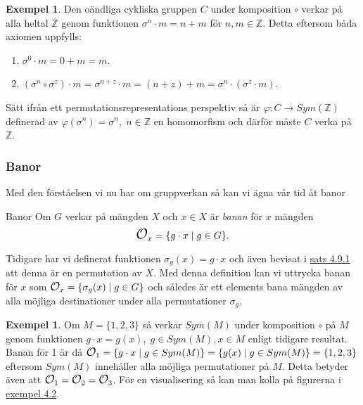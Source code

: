 \documentclass{article}
\newcommand{\orbit}[0]{\mathlarger{\mathlarger{\mathcal{O}}}}
\theoremstyle{definition}
\newtheorem{exmp}[thm]{Exempel}
\begin{document}
\begin{exmp}
  Den oändliga cykliska gruppen $C$ under komposition $\circ$ verkar på alla heltal $\mathbb{Z}$
  genom funktionen $\sigma^n \cdot m = n + m$ för $n, m \in \mathbb{Z}$.
  Detta eftersom båda axiomen uppfylls:
  \begin{enumerate}
    \item $\sigma^0 \cdot m = 0 + m = m$.
    \item $(\sigma^n \circ \sigma^z) \cdot m = \sigma^{n + z} \cdot m = (n + z) + m = 
    \sigma^n \cdot (\sigma^z \cdot m)$.
  \end{enumerate}
  Sätt ifrån ett permutationsrepresentations perspektiv så är 
  $\varphi: C \rightarrow Sym(\mathbb{Z})$ definerad av $\varphi(\sigma^n) = \sigma^n, \; 
  n \in \mathbb{Z}$ en homomorfism och därför måste $C$ verka på $\mathbb{Z}$.
\end{exmp}


\subsubsection{Banor}
Med den förståelsen vi nu har om gruppverkan så kan vi ägna vår tid åt banor
\begin{mydef}{Banor}{}
  Om $G$ verkar på mängden $X$ och $x \in X$ är \textit{banan} för $x$ mängden 
  \[\orbit_x = \{g \cdot x \; | \; g \in G\}.\]
\end{mydef}
Tidigare har vi definerat funktionen $\sigma_g(x) = g \cdot x$ och även bevisat i 
\hyperlink{sats4.9.1}{sats 4.9.1} att 
denna är en permutation av $X$. Med denna definition kan vi uttrycka banan för $x$ som 
$\orbit_x = \{\sigma_g(x) \; | \; g \in G\}$ och 
således är ett elements bana mängden av alla möjliga destinationer under alla permutationer 
$\sigma_g$.

\begin{exmp}
  Om $M = \{1, 2, 3\}$ så verkar $Sym(M)$ under komposition $\circ$ på $M$ 
  genom funktionen $g \cdot x = g(x), \; g \in Sym(M), x \in M$ enligt tidigare resultat. Banan för 
  1 är då $\orbit_1 = \{g \cdot x \; | \; g \in Sym(M)\} = \{g(x) \; | \; g \in Sym(M)\}
  = \{1, 2, 3\}$ eftersom $Sym(M)$ innehåller alla möjliga permutationer på $M$.
  Detta betyder även att $\orbit_1 = \orbit_2 = \orbit_3$. För en visualisering så
  kan man kolla på figurerna i \hyperlink{exempel4.2}{exempel 4.2}.
\end{exmp}
\end{document}
